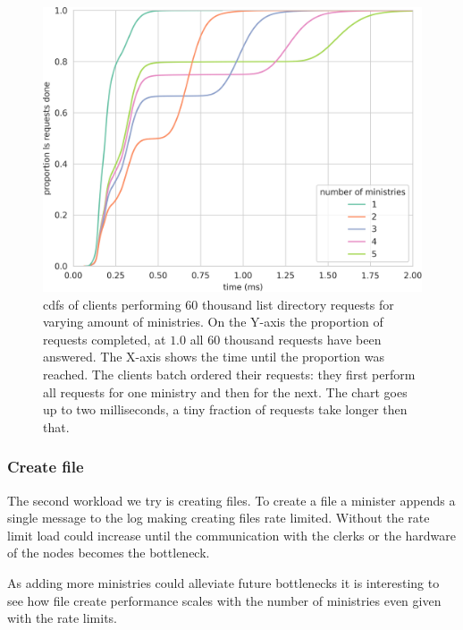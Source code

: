 \begin{figure}[htb]
	\centering
	\includegraphics[height=\textheight]{../results/plots/ls_batch.png}
	\caption{\acp{cdf} of clients performing 60 thousand list directory requests for varying amount of ministries. On the Y-axis the proportion of requests completed, at $1.0$ all 60 thousand requests have been answered. The X-axis shows the time until the proportion was reached. The clients batch ordered their requests: they first perform all requests for one ministry and then for the next. The chart goes up to two milliseconds, a tiny fraction of requests take longer then that.}
	\label{fig:ls_cdf}
\end{figure}

\clearpage
\subsubsection*{Create file}
The second workload we try is creating files. To create a file a minister appends a single message to the log making creating files rate limited. Without the rate limit load could increase until the communication with the clerks or the hardware of the nodes becomes the bottleneck.%

As adding more ministries could alleviate future bottlenecks it is interesting to see how file create performance scales with the number of ministries even given with the rate limits.


